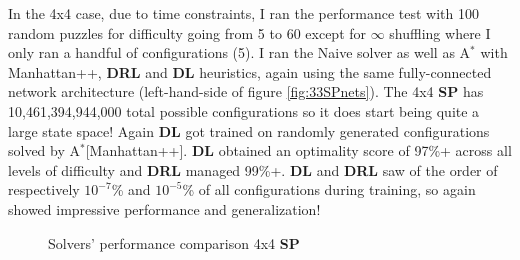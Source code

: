 

In the 4x4 case, due to time constraints, I ran the performance test with 100 random puzzles for difficulty going from 5 to 60 except for $\infty$ shuffling where I only ran a handful of configurations (5). I ran the Naive solver as well as A$^{*}$ with Manhattan++, \textbf{DRL} and \textbf{DL} heuristics, again using the same fully-connected network architecture (left-hand-side of figure \ref{fig:33SPnets}). The 4x4 \textbf{SP} has 10,461,394,944,000 total possible configurations so it does start being quite a large state space! Again \textbf{DL} got trained on randomly generated configurations solved by A$^{*}$[Manhattan++]. \textbf{DL} obtained an optimality score of 97\%+ across all levels of difficulty and \textbf{DRL} managed 99\%+. \textbf{DL} and \textbf{DRL} saw of the order of respectively $10^{-7}$\% and $10^{-5}$\% of all configurations during training, so again showed impressive performance and generalization!


\label{ssec:44SPSC}

\begin{figure}[H]
  \noindent
  \caption[44SPPerformance]{Solvers' performance comparison 4x4 \textbf{SP}}
  \label{fig:44SPPerformance}
\end{figure}

